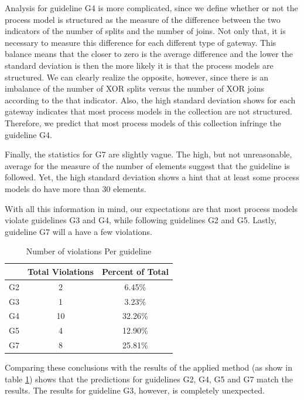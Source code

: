 \documentclass[a4paper,twoside]{article}
\begin{document}
Analysis for guideline G4 is more complicated, since we define whether or not the process model is structured as the measure of the difference between the two indicators of the number of splits and the number of joins. Not only that, it is necessary to measure this difference for each different type of gateway. This balance means that the closer to zero is the average difference and the lower the standard deviation is then the more likely it is that the process models are structured.  We can clearly realize the opposite, however, since there is an imbalance of the number of XOR splits versus the number of XOR joins according to the that indicator. Also, the high standard deviation shows for each gateway indicates that most process models in the collection are not structured. Therefore, we predict that most process models of this collection infringe the guideline G4.

Finally, the statistics for G7 are slightly vague. The high, but not unreasonable, average for the measure of the number of elements suggest that the guideline is followed. Yet, the high standard deviation shows a hint that at least some process models do have more than 30 elements.

With all this information in mind, our expectations are that most process models violate guidelines G3 and G4, while following guidelines G2 and G5. Lastly, guideline G7 will a have a few violations.

\begin{table}[]
	\centering
	\caption{Number of violations Per guideline}
	\label{ViolationsPerGuideline}
	\begin{tabular}{|c|c|c|}
		\hline
		& Total Violations & Percent of Total \\ \hline
		G2 & 2 & 6.45\% \\ \hline
		G3 & 1 & 3.23\% \\ \hline
		G4 & 10 & 32.26\% \\ \hline %
		G5 & 4 & 12.90\% \\ \hline
		G7 & 8 & 25.81\% \\ \hline
	\end{tabular}
\end{table}

Comparing these conclusions with the results of the applied method (as show in table \ref{ViolationsPerGuideline}) shows that the predictions for guidelines G2, G4, G5 and G7 match the results. The results for guideline G3, however, is completely unexpected. 
\end{document}
